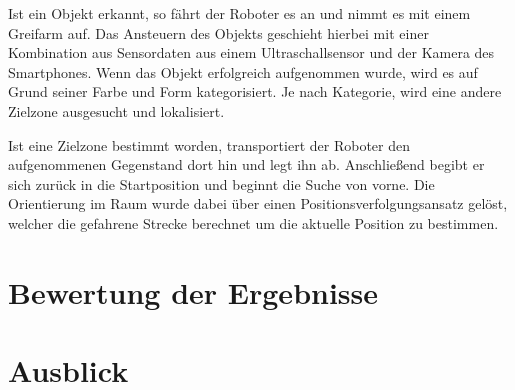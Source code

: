 Ist ein Objekt erkannt, so fährt der Roboter es an und nimmt es mit einem Greifarm auf. Das Ansteuern des Objekts geschieht hierbei mit einer Kombination aus Sensordaten aus einem Ultraschallsensor und der Kamera des Smartphones. Wenn das Objekt erfolgreich aufgenommen wurde, wird es auf Grund seiner Farbe und Form kategorisiert. Je nach Kategorie, wird eine andere Zielzone ausgesucht und lokalisiert.

Ist eine Zielzone bestimmt worden, transportiert der Roboter den aufgenommenen Gegenstand dort hin und legt ihn ab. Anschließend begibt er sich zurück in die Startposition und beginnt die Suche von vorne. Die Orientierung im Raum wurde dabei über einen Positionsverfolgungsansatz gelöst, welcher die gefahrene Strecke berechnet um die aktuelle Position zu bestimmen.

\section{Bewertung der Ergebnisse}

\section{Ausblick}